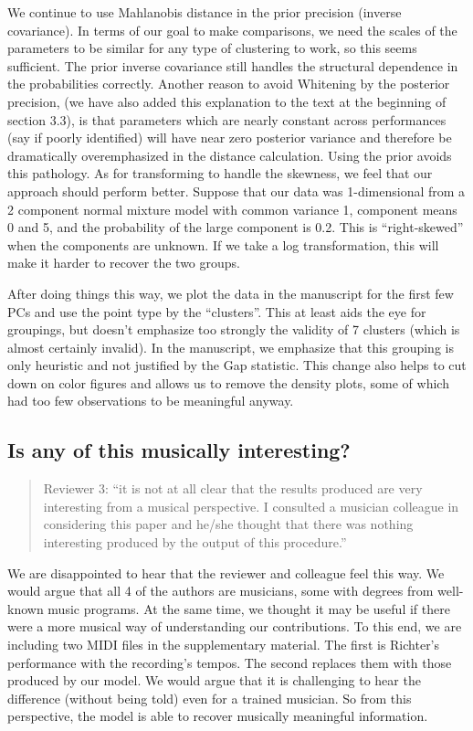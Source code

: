\documentclass[12pt]{article}
\newenvironment{resp}{\color{cobalt}}{}
\begin{document}
\begin{resp}
    We continue to use Mahlanobis distance in the prior precision (inverse covariance). In terms of our goal to make comparisons, we need the scales of the parameters to be similar for any type of clustering to work, so this seems sufficient. The prior inverse covariance still handles the structural dependence in the probabilities correctly. Another reason to avoid Whitening by the posterior precision, (we have also added this explanation to the text at the beginning of section 3.3), is that parameters which are nearly constant across performances (say if poorly identified) will have near zero posterior variance and therefore be dramatically overemphasized in the distance calculation. Using the prior avoids this pathology. As for transforming to handle the skewness, we feel that our approach should perform better. Suppose that our data was 1-dimensional from a 2 component normal mixture model with common variance 1, component means 0 and 5, and the probability of the large component is 0.2. This is ``right-skewed'' when the components are unknown. If we take a log transformation, this will make it harder to recover the two groups.

    After doing things this way, we plot the data in the manuscript for the first few PCs and use the point type by the ``clusters''. This at least aids the eye for groupings, but doesn't emphasize too strongly the validity of 7 clusters (which is almost certainly invalid). In the manuscript, we emphasize that this grouping is only heuristic and not justified by the Gap statistic. This change also helps to cut down on color figures and allows us to remove the density plots, some of which had too few observations to be meaningful anyway. 
  \end{resp}

  \subsection*{Is any of this musically interesting?}
  
  \begin{quote}
    Reviewer 3: ``it is not at all clear that the results produced 
    are very interesting from a musical perspective. I consulted a 
    musician colleague in considering this paper and he/she thought that 
    there was nothing interesting produced by the output of this procedure.''
  \end{quote}
  
  \begin{resp}
    We are disappointed to hear that the reviewer and colleague feel this way. We would argue that all 4 of the authors are musicians, some with degrees from well-known music programs. At the same time, we thought it may be useful if there were a more musical way of understanding our contributions. To this end, we are including two MIDI files in the supplementary material. The first is Richter's performance with the recording's tempos. The second replaces them with those produced by our model. We would argue that it is challenging to hear the difference (without being told) even for a trained musician. So from this perspective, the model is able to recover musically meaningful information. 
  \end{resp}
  
\end{document}
